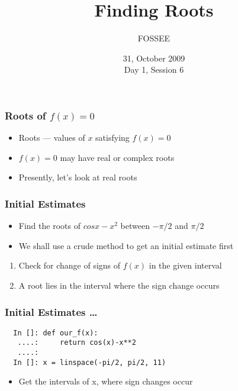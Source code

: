 \documentclass[14pt,compress]{beamer}
\title[]{Finding Roots}
\author[FOSSEE] {FOSSEE}
\institute[IIT Bombay] {Department of Aerospace Engineering\\IIT Bombay}
\date[] {31, October 2009\\Day 1, Session 6}
\begin{document}
\begin{frame}
  \maketitle
\end{frame}



\begin{frame}[fragile]
\frametitle{Roots of $f(x)=0$}
\begin{itemize}
\item Roots --- values of $x$ satisfying $f(x)=0$
\item $f(x)=0$ may have real or complex roots
\item Presently, let's look at real roots
\end{itemize}
\end{frame}

\begin{frame}[fragile]
\frametitle{Initial Estimates}
\begin{itemize}
\item Find the roots of $cosx-x^2$ between $-\pi/2$ and $\pi/2$
\item We shall use a crude method to get an initial estimate first
\end{itemize}
\begin{enumerate}
\item Check for change of signs of $f(x)$ in the given interval
\item A root lies in the interval where the sign change occurs
\end{enumerate}
\end{frame}

\begin{frame}[fragile]
\frametitle{Initial Estimates \ldots}
\begin{lstlisting}
  In []: def our_f(x):
   ....:     return cos(x)-x**2
   ....: 
  In []: x = linspace(-pi/2, pi/2, 11)
\end{lstlisting}
\begin{itemize}
\item Get the intervals of x, where sign changes occur
\end{itemize}
\end{frame}

\end{document}
